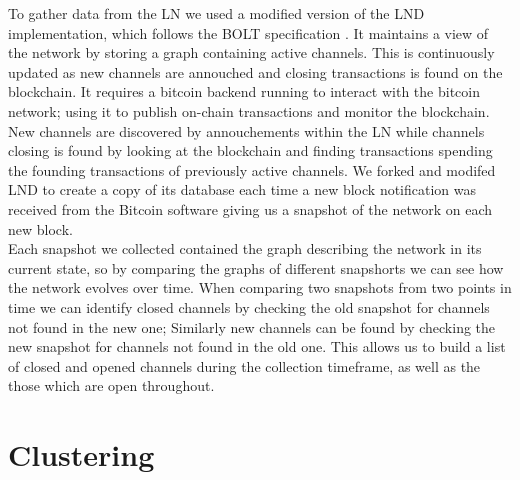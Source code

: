 To gather data from the LN we used a modified version of the LND  implementation, which follows the BOLT specification . It maintains a view of the network by storing a graph containing active channels. This is continuously updated as new channels are annouched and closing transactions is found on the blockchain. It requires a bitcoin backend running to interact with the bitcoin network; using it to publish on-chain transactions and monitor the blockchain. New channels are discovered by annouchements within the LN while channels closing is found by looking at the blockchain and finding transactions spending the founding transactions of previously active channels. We forked and modifed LND to create a copy of its database each time a new block notification was received from the Bitcoin software giving us a snapshot of the network on each new block.
\\

Each snapshot we collected contained the graph describing the network in its current state, so by comparing the graphs of different snapshorts we can see how the network evolves over time. When comparing two snapshots from two points in time we can identify closed channels by checking the old snapshot for channels not found in the new one; Similarly new channels can be found by checking the new snapshot for channels not found in the old one. This allows us to build a list of closed and opened channels during the collection timeframe, as well as the those which are open throughout. 



\section{Clustering}


